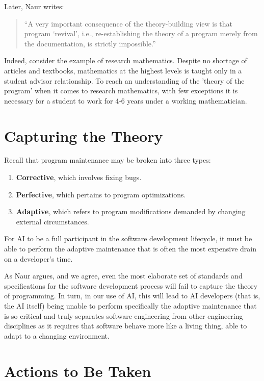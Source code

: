 \documentclass[12pt]{extarticle}
\begin{document}
Later, Naur writes:
\begin{quote}
  ``A very important consequence of the theory-building view is that
  program `revival', i.e., re-establishing the theory of a program
  merely from the documentation, is strictly impossible.''
\end{quote}

Indeed, consider the example of research mathematics. Despite no shortage of articles and textbooks, mathematics at the highest levels is taught only in a student advisor relationship. To reach an understanding of the 'theory of the program' when it comes to research mathematics, with few exceptions it is necessary for a student to work for 4-6 years under a working mathematician. 

\section{Capturing the Theory}

Recall that program maintenance may be broken into three types:
\begin{enumerate}
  \item \textbf{Corrective}, which involves fixing bugs.
  \item \textbf{Perfective}, which pertains to program optimizations.
  \item \textbf{Adaptive}, which refers to program modifications
    demanded by changing external circumstances.
\end{enumerate}

For AI to be a full participant in the software development lifecycle, it must be able to perform the adaptive maintenance that is often the most expensive drain on a developer's time. 

As Naur argues, and we agree, even the most elaborate set of standards
and specifications for the software development process will fail to
capture the theory of programming. In turn, in our use of AI, this
will lead to AI developers (that is, the AI itself) being unable to
perform specifically the adaptive maintenance that is so critical and
truly separates software engineering from other engineering
disciplines as it requires that software behave more like a living
thing, able to adapt to a changing environment.

\section{Actions to Be Taken}
\end{document}
